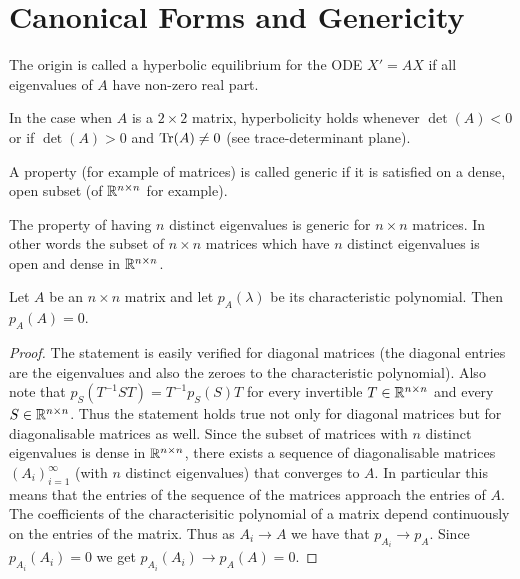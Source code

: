 \section{Canonical Forms and Genericity}

\begin{definition}[Hyperbolicity]
    The origin is called a hyperbolic equilibrium for the ODE $X' = AX$ if all eigenvalues of $A$ have non-zero real part. 
\end{definition}
In the case when $A$ is a $2 \times 2$ matrix, hyperbolicity holds whenever $\det(A) < 0$ or if $\det(A) > 0$ and $\mathrm{Tr}(A) \neq 0$ (see trace-determinant plane). 

\begin{definition}[Genericity]
    A property (for example of matrices) is called generic if it is satisfied on a dense, open subset (of $\mathbb{R}^{n \times n}$ for example).
\end{definition}

\begin{theorem}
The property of having $n$ distinct eigenvalues is generic for $n \times n$ matrices. In other words the subset of $n \times n$ matrices which have $n$ distinct eigenvalues is open and dense in $\mathbb{R}^{n \times n}$.
\end{theorem}

\begin{corollary}
Let $A$ be an $n \times n$ matrix and let $p_{A}(\lambda)$ be its characteristic polynomial. Then $p_{A}(A) = 0$.
\end{corollary}
\begin{proof}
    The statement is easily verified for diagonal matrices (the diagonal entries are the eigenvalues and also the zeroes to the characteristic polynomial). Also note that $p_{S}(T^{-1}ST) = T^{-1}p_{S}(S)T$ for every invertible $T \in \mathbb{R}^{n \times n}$ and every $S \in \mathbb{R}^{n \times n}$. Thus the statement holds true not only for diagonal matrices but for diagonalisable matrices as well. Since the subset of matrices with $n$ distinct eigenvalues is dense in $\mathbb{R}^{n \times n}$, there exists a sequence of diagonalisable matrices $(A_i)_{i = 1}^{\infty}$ (with $n$ distinct eigenvalues) that converges to $A$. In particular this means that the entries of the sequence of the matrices approach the entries of $A$. The coefficients of the characterisitic polynomial of a matrix depend continuously on the entries of the matrix. Thus as $A_i \to A$ we have that $p_{A_i} \to p_A$. Since $p_{A_i}(A_i) = 0$ we get $p_{A_i}(A_i) \to p_A(A) = 0$.
\end{proof}

